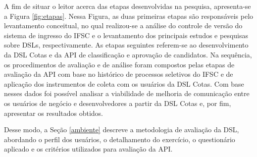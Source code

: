      A fim de situar o leitor acerca das etapas desenvolvidas na pesquisa, apresenta-se a Figura \ref{fig:etapas}. Nessa Figura, as duas primeiras etapas são responsáveis pelo levantamento conceitual, no qual realizou-se a análise do controle de versão do sistema de ingresso do IFSC e o levantamento dos principais estudos e pesquisas sobre \gls{DSL}s, respectivamente. As etapas seguintes referem-se ao desenvolvimento da DSL Cotas e da API de classificação e aprovação de candidatos. Na sequência, os procedimentos de avaliação e de análise foram compostos pelas etapas de avaliação da API com base no histórico de processos seletivos do IFSC e de aplicação dos instrumentos de coleta com os usuários da DSL Cotas. Com base nesses dados foi possível analisar a viabilidade de melhoria de comunicação entre os usuários de negócio e desenvolvedores a partir da DSL Cotas e, por fim, apresentar os resultados obtidos.
    
    
    
    
 
    Desse modo, a Seção \ref{ambiente} descreve a metodologia de avaliação da DSL, abordando o perfil dos usuários, o detalhamento do exercício, o questionário aplicado e os critérios utilizados para avaliação da \gls{API}. 
    
    
    
  